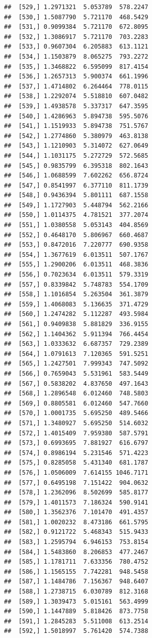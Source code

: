 \documentclass[article]{jss}\usepackage[]{graphicx}\usepackage[]{xcolor}
\makeatletter
\newenvironment{kframe}{%
 \def\at@end@of@kframe{}%
 \ifinner\ifhmode%
  \def\at@end@of@kframe{\end{minipage}}%
  \begin{minipage}{\columnwidth}%
 \fi\fi%
 \def\FrameCommand##1{\hskip\@totalleftmargin \hskip-\fboxsep
 \colorbox{shadecolor}{##1}\hskip-\fboxsep
     \hskip-\linewidth \hskip-\@totalleftmargin \hskip\columnwidth}%
 \MakeFramed {\advance\hsize-\width
   \@totalleftmargin\z@ \linewidth\hsize
   \@setminipage}}%
 {\par\unskip\endMakeFramed%
 \at@end@of@kframe}
\newenvironment{knitrout}{}{} %
\makeatother
\begin{document}
\begin{knitrout}
\begin{kframe}
\begin{verbatim}
##  [529,] 1.2971321  5.053789  578.2247
##  [530,] 1.5087790  5.721170  468.5429
##  [531,] 0.9099384  5.721170  672.8095
##  [532,] 1.3086917  5.721170  703.2283
##  [533,] 0.9607304  6.205883  613.1121
##  [534,] 1.1503879  8.065275  793.2272
##  [535,] 1.3468822  6.595099  817.4154
##  [536,] 1.2657313  5.900374  661.1996
##  [537,] 1.4714802  6.264464  778.0115
##  [538,] 1.2292074  5.518810  607.0482
##  [539,] 1.4938578  5.337317  647.3595
##  [540,] 1.4286963  5.894738  595.5076
##  [541,] 1.1519933  5.894738  751.5767
##  [542,] 1.2774860  5.380979  463.8138
##  [543,] 1.1210903  5.314072  627.0649
##  [544,] 1.1031175  5.272729  572.5685
##  [545,] 0.9835799  6.395318  802.1643
##  [546,] 1.0688599  7.602262  656.8724
##  [547,] 0.8541997  6.377110  811.1739
##  [548,] 0.9436394  5.801111  687.1558
##  [549,] 1.1727903  5.448794  562.2166
##  [550,] 1.0114375  4.781521  377.2074
##  [551,] 1.0380558  5.053143  404.8569
##  [552,] 0.4648170  5.806967  660.4687
##  [553,] 0.8472016  7.220777  690.9358
##  [554,] 1.3677619  6.013511  507.1767
##  [555,] 1.2900206  6.013511  468.3836
##  [556,] 0.7023634  6.013511  579.3319
##  [557,] 0.8339842  5.748783  554.1709
##  [558,] 1.1016854  5.263504  361.3879
##  [559,] 1.4068083  5.136635  371.4729
##  [560,] 1.2474282  5.112287  493.5984
##  [561,] 0.9409838  5.881829  336.9155
##  [562,] 1.1404362  5.911394  766.4454
##  [563,] 1.0333632  6.687357  729.2389
##  [564,] 1.0791613  7.120365  591.5251
##  [565,] 1.2427501  7.999343  747.5092
##  [566,] 0.7659043  5.531961  583.5449
##  [567,] 0.5838202  4.837650  497.1643
##  [568,] 1.2896548  6.012460  748.5803
##  [569,] 0.8805581  6.012460  547.7660
##  [570,] 1.0001735  5.695250  489.5466
##  [571,] 1.3480927  5.695250  514.6032
##  [572,] 1.4015409  7.959380  587.5791
##  [573,] 0.6993695  7.881927  616.6797
##  [574,] 0.8986194  5.231546  571.4223
##  [575,] 0.8285058  5.431340  681.1787
##  [576,] 1.0506009  7.614155 1046.7171
##  [577,] 0.6495198  7.151422  904.0632
##  [578,] 1.2362096  8.502699  585.8177
##  [579,] 1.4011573  7.186324  590.9141
##  [580,] 1.3562376  7.101470  491.4357
##  [581,] 1.0020232  8.473186  661.5795
##  [582,] 0.9121722  5.468343  515.9433
##  [583,] 1.2595794  6.946153  753.8154
##  [584,] 1.5483860  8.206853  477.2467
##  [585,] 1.1781711  7.633356  780.4752
##  [586,] 1.1565155  7.742281  948.5458
##  [587,] 1.1484786  7.156367  948.6407
##  [588,] 1.2738715  6.030789  812.3168
##  [589,] 1.3039473  5.015161  563.4999
##  [590,] 1.1447889  5.818426  873.7758
##  [591,] 1.2845283  5.511008  613.2514
##  [592,] 1.5018997  5.761420  574.7388

\end{verbatim}
\end{kframe}
\end{knitrout}
\end{document}

